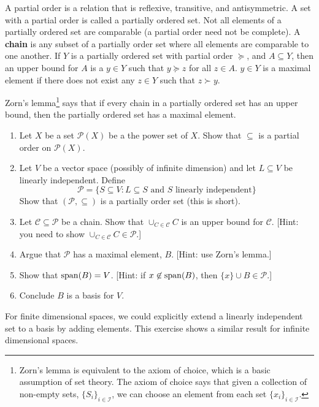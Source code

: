 \begin{exercise}\label{ex:basis}
  A partial order is a relation that is reflexive, transitive, and
  antisymmetric. A set with a partial order is called a partially
  ordered set. Not all elements of a partially ordered set are
  comparable (a partial order need not be complete). A \textbf{chain}
  is any subset of a partially order set where all elements are
  comparable to one another. If $Y$ is a partially ordered set with
  partial order $\succeq$, and $A \subseteq Y$, then an upper bound
  for $A$ is a $y \in Y$ such that $y \succeq z$ for all $z \in A$.
  $y \in Y$ is a maximal element if there does not exist any $z \in Y$
  such that $z \succ y$.
  
  Zorn's lemma\footnote{Zorn's lemma is equivalent to the axiom of
    choice, which is a basic assumption of set theory. The axiom of
    choice says that given a collection of non-empty sets,
    $\{S_i\}_{i \in \mathcal{I}}$, we can choose an element from each
    set $\{x_i\}_{i \in \mathcal{I}}$.} says that if every chain in a
  partially ordered set has an upper bound, then the partially ordered
  set has a maximal element.
  \begin{enumerate}
  \item Let $X$ be a set $\mathcal{P}(X)$ be a the power set of
    $X$. Show that $\subseteq$ is a partial order on $\mathcal{P}(X)$.
  \item Let $V$ be a vector space (possibly of infinite dimension) and
    let $L \subseteq V$ be linearly independent. Define 
    \[ \mathcal{P} = \{S \subseteq V: L \subseteq S \text{ and } S
    \text{ linearly independent}\} \]
    Show that $(\mathcal{P},\subseteq)$ is a partially order set (this is
    short).
  \item Let $\mathcal{C} \subseteq \mathcal{P}$ be a chain. Show that
    $\cup_{C \in \mathcal{C}} C$ is an upper bound for
    $\mathcal{C}$. [Hint: you need to show $\cup_{C \in \mathcal{C}} C
    \in \mathcal{P}$.]
  \item Argue that $\mathcal{P}$ has a maximal element, $B$. [Hint:
    use Zorn's lemma.]
  \item Show that $\mathrm{span}(B) = V$. [Hint: if $x \not\in \mathrm{span}(B)$, then
    $\{x\} \cup B \in \mathcal{P}$.]
  \item Conclude $B$ is a basis for $V$.
  \end{enumerate}
  For finite dimensional spaces, we could explicitly extend a linearly
  independent set to a basis by adding elements. This exercise shows a
  similar result for infinite dimensional spaces.
\end{exercise}

